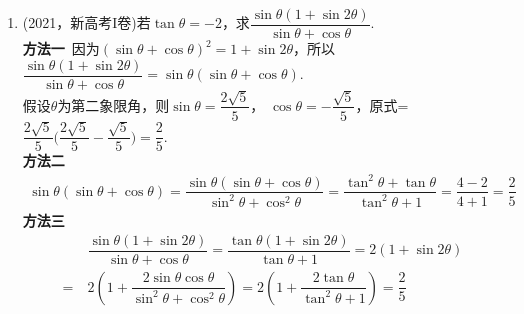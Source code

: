 \begin{enumerate}[label={【\textbf{例\thechapter.\arabic*}】},
 leftmargin=\inteval{\myenumleftmargin}pt,
 itemsep=\inteval{\myenumitempsep}pt,
 itemindent=\inteval{\myenumitemindent}pt]
C对应的曲线是$ (y-x^2)(y+x^2)=0 $，D对应的曲线的极坐标方程是$ r^2=2\cos2\theta=
2(\cos^2\theta-\sin^2\theta) $，直角坐标方程是$ (x^2+y^2)^2=2(x^2-y^2) $，
这种曲线被称为双纽线。

\item (2021，新高考I卷)若$ \tan\theta=-2 $，求$ \dfrac{\sin\theta(1+\sin2\theta)}{
    \sin\theta+\cos\theta} $. \\
\textbf{方法一}\ 因为$ (\sin\theta+\cos\theta)^2=1+\sin2\theta $，所以
$ \dfrac{\sin\theta(1+\sin2\theta)}{\sin\theta+\cos\theta}=
\sin\theta(\sin\theta+\cos\theta) $. \\
假设$ \theta $为第二象限角，则$ \sin\theta=\dfrac{2\sqrt{5}}{5} $，
$ \cos\theta=-\dfrac{\sqrt{5}}{5} $，原式=$ \dfrac{2\sqrt{5}}{5}\Big(
\dfrac{2\sqrt{5}}{5}-\dfrac{\sqrt{5}}{5}\Big)=\dfrac{2}{5} $.\\
\textbf{方法二}\ 
\begin{gather*}
    \sin\theta(\sin\theta+\cos\theta)=\dfrac{\sin\theta(\sin\theta+\cos\theta)}
    {\sin^2\theta+\cos^2\theta}=\dfrac{\tan^2\theta+\tan\theta}{\tan^2\theta+1}
    =\dfrac{4-2}{4+1}=\dfrac{2}{5}
\end{gather*}
\textbf{方法三}\ 
\begin{align*}
    &\ \dfrac{\sin\theta(1+\sin2\theta)}{\sin\theta+\cos\theta} =
    \dfrac{\tan\theta(1+\sin2\theta)}{\tan\theta+1}=2(1+\sin2\theta) \\
    =&\ 2\left(1+\dfrac{2\sin\theta\cos\theta}{\sin^2\theta+
        \cos^2\theta}\right)=
    2\left(1+\dfrac{2\tan\theta}{\tan^2\theta+1}\right)=\dfrac{2}{5}
\end{align*}


\end{enumerate}
